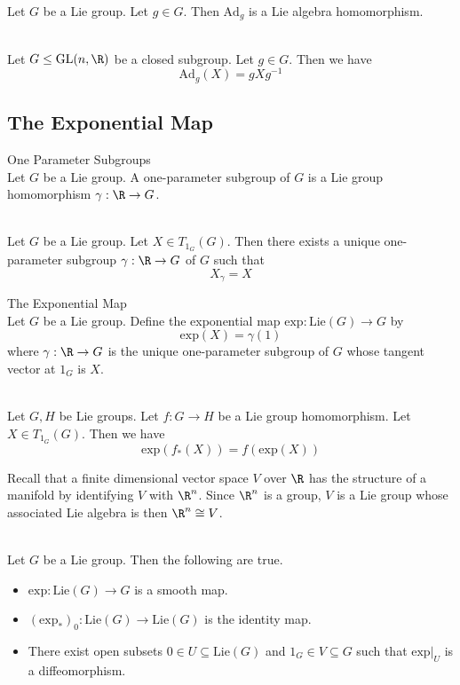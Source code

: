 \documentclass[a4paper]{article}
\begin{document}
\begin{lmm}{}{}\\
Let $G$ be a Lie group. Let $g\in G$. Then $\text{Ad}_g$ is a Lie algebra homomorphism. 
\end{lmm}

\begin{eg}{}{}\\
Let $G\leq\text{GL}(n,\R)$ be a closed subgroup. Let $g\in G$. Then we have $$\text{Ad}_g(X)=gXg^{-1}$$
\end{eg}

\subsection{The Exponential Map}
\begin{defn}{One Parameter Subgroups}{}\\
Let $G$ be a Lie group. A one-parameter subgroup of $G$ is a Lie group homomorphism $\gamma:\R\to G$. 
\end{defn}

\begin{lmm}{}{}\\
Let $G$ be a Lie group. Let $X\in T_{1_G}(G)$. Then there exists a unique one-parameter subgroup $\gamma:\R\to G$ of $G$ such that $$X_{\gamma}=X$$
\end{lmm}

\begin{defn}{The Exponential Map}{}\\
Let $G$ be a Lie group. Define the exponential map $\text{exp}:\text{Lie}(G)\to G$ by $$\text{exp}(X)=\gamma(1)$$ where $\gamma:\R\to G$ is the unique one-parameter subgroup of $G$ whose tangent vector at $1_G$ is $X$. 
\end{defn}

\begin{prp}{}{}\\
Let $G,H$ be Lie groups. Let $f:G\to H$ be a Lie group homomorphism. Let $X\in T_{1_G}(G)$. Then we have $$\text{exp}(f_\ast(X))=f(\text{exp}(X))$$
\end{prp}

Recall that a finite dimensional vector space $V$ over $\R$ has the structure of a manifold by identifying $V$ with $\R^n$. Since $\R^n$ is a group, $V$ is a Lie group whose associated Lie algebra is then $\R^n\cong V$. 

\begin{prp}{}{}\\
Let $G$ be a Lie group. Then the following are true. 
\begin{itemize}
\item $\text{exp}:\text{Lie}(G)\to G$ is a smooth map. 
\item $(\text{exp}_\ast)_0:\text{Lie}(G)\to\text{Lie}(G)$ is the identity map. 
\item There exist open subsets $0\in U\subseteq\text{Lie}(G)$ and $1_G\in V\subseteq G$ such that $\text{exp}|_U$ is a diffeomorphism. 
\end{itemize}
\end{prp}
\end{document}
